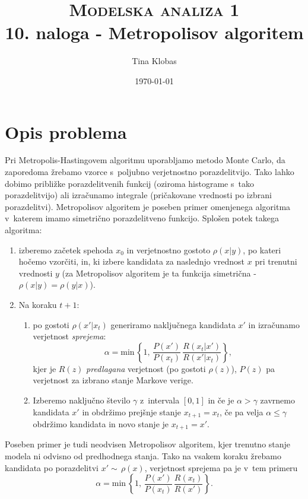 \documentclass[a4paper,pdftex,10pt]{article}
\title{	
\normalfont \normalsize 
\textsc{Modelska analiza 1} \\ [25pt] %
\huge 10. naloga - Metropolisov algoritem\\ %
}
\author{Tina Klobas} %
\date{\normalsize\today} %
\numberwithin{figure}{section} %
\begin{document}
\maketitle %

\section{Opis problema}
Pri Metropolis-Hastingovem algoritmu uporabljamo metodo Monte Carlo, da zaporedoma žrebamo 
vzorce s~poljubno verjetnostno porazdelitvijo. Tako lahko dobimo približke porazdelitvenih
funkcij (oziroma histograme s~tako porazdelitvijo) ali izračunamo integrale (pričakovane
vrednosti po izbrani porazdelitvi). Metropolisov algoritem je poseben primer omenjenega
algoritma v~katerem imamo simetrično porazdelitveno funkcijo. Splošen potek takega
algoritma:
\begin{enumerate}
    \item izberemo začetek spehoda $x_0$ in verjetnostno gostoto $\rho (x|y)$, po
	kateri hočemo vzorčiti, in, ki izbere kandidata za naslednjo vrednost $x$ pri 
	trenutni vrednosti $y$ (za Metropolisov algoritem je ta funkcija simetrična - 
	$\rho (x|y) = \rho (y|x)$).
    \item Na koraku $t+1$:
	\begin{enumerate}
	    \item po gostoti $\rho (x'|x_t)$ generiramo naključnega kandidata $x'$ in 
		izračunamo verjetnost \emph{sprejema}:
		\begin{equation}
		    \alpha = \mathrm{min} \, \left\{
			1, \, \frac{P(x')}{P(x_t)} \, \frac{R(x_t|x')}{R(x'|x_t)} \right\},
		\end{equation}
		kjer je $R(z)$ \emph{predlagana} verjetnost (po gostoti $\rho (z)$),
		$P(z)$ pa verjetnost za izbrano stanje Markove verige.
	    \item Izberemo naključno število $\gamma$ z~intervala $[0,1]$ in če je $\alpha 
		> \gamma $ zavrnemo kandidata $x'$ in obdržimo prejšnje stanje $x_{t+1} = 
		x_t$, če pa velja $\alpha \leq \gamma$ obdržimo kandidata in novo stanje je
		$x_{t+1} = x'$.
	\end{enumerate}
\end{enumerate}
Poseben primer je tudi neodvisen Metropolisov algoritem, kjer trenutno stanje modela ni 
odvisno od predhodnega stanja. Tako na vsakem koraku žrebamo kandidata po porazdelitvi 
$x' \sim \, \rho(x)$, verjetnost sprejema pa je v~tem primeru
\begin{equation} 
    \alpha = \mathrm{min} \, \left\{ 1, \, \frac{P(x')}{P(x_t)} \, \frac{R(x_t)}{R(x')} 
    \right\}.
\end{equation}
\end{document}
